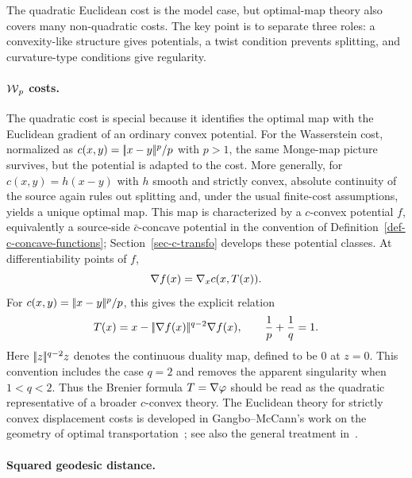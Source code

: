 The quadratic Euclidean cost is the model case, but optimal-map theory also covers many non-quadratic costs. The key point is to separate three roles: a convexity-like structure gives potentials, a twist condition prevents splitting, and curvature-type conditions give regularity.

\paragraph{\texorpdfstring{$\operatorname{\mathcal{W}}_p$ costs.}{Wp costs}}

The quadratic cost is special because it identifies the optimal map with the Euclidean gradient of an ordinary convex potential. For the Wasserstein cost, normalized as \(c(x,y)=|\!| x-y |\!|^p/p\) with \(p>1\), the same Monge-map picture survives, but the potential is adapted to the cost. More generally, for \(c(x,y)=h(x-y)\) with \(h\) smooth and strictly convex, absolute continuity of the source again rules out splitting and, under the usual finite-cost assumptions, yields a unique optimal map. This map is characterized by a \(c\)-convex potential \(f\), equivalently a source-side \(\bar c\)-concave potential in the convention of Definition~\ref{def-c-concave-functions}; Section~\ref{sec-c-transfo} develops these potential classes. At differentiability points of \(f\),
\[
	\nabla f(x)=\nabla_x c(x,T(x)).
\]
For \(c(x,y)=|\!| x-y |\!|^p/p\), this gives the explicit relation
\[
	T(x)=x-|\!| \nabla f(x) |\!|^{q-2}\nabla f(x),
	\qquad \frac1p+\frac1q=1.
\]
Here $|\!| z |\!|^{q-2}z$ denotes the continuous duality map, defined to be $0$ at $z=0$. This convention includes the case $q=2$ and removes the apparent singularity when $1<q<2$.
Thus the Brenier formula \(T=\nabla\varphi\) should be read as the quadratic representative of a broader \(c\)-convex theory. The Euclidean theory for strictly convex displacement costs is developed in Gangbo--McCann's work on the geometry of optimal transportation~\cite{gangbo1996geometry}; see also the general treatment in~\cite{Villani09}.

\paragraph{Squared geodesic distance.}

